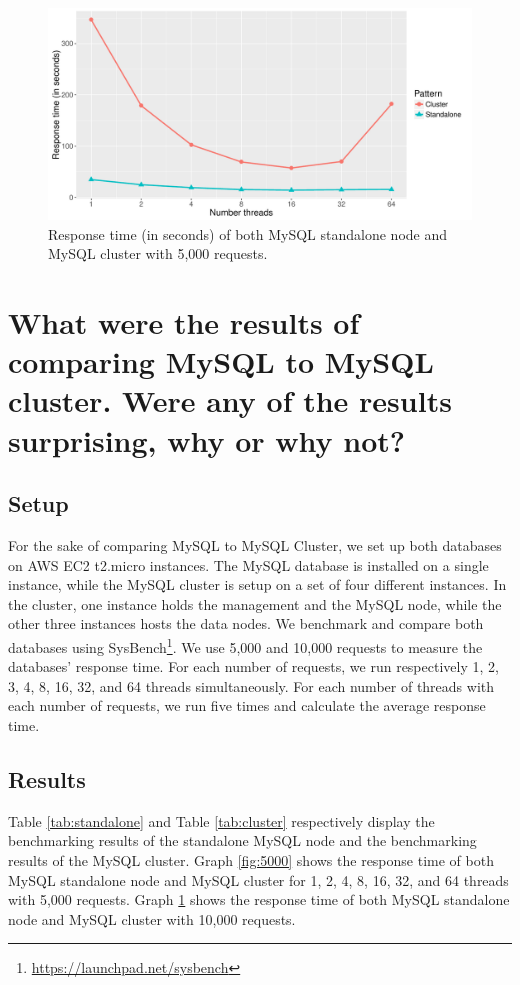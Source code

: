 \documentclass{article}
\begin{document}
  
\begin{figure}[!]
    \centering
        \includegraphics[width = \columnwidth]{images/10000.pdf}
    \caption{Response time (in seconds) of both MySQL standalone node and MySQL cluster with 5,000 requests.}
    \label{fig:10000}
\end{figure}



\section{What were the results of comparing MySQL to MySQL cluster. Were any of the results surprising, why or why not?}\label{Q1}
\subsection{Setup}
For the sake of comparing MySQL to MySQL Cluster, we set up both databases on AWS EC2 t2.micro instances. The MySQL database is installed on a single instance, while the MySQL cluster is setup on a set of four different instances. In the cluster, one instance holds the management and the MySQL node, while the other three instances hosts the data nodes. We benchmark and compare both databases using SysBench\footnote{\url{https://launchpad.net/sysbench}}. We use 5,000 and 10,000 requests to measure the databases' response time. For each number of requests, we run respectively 1, 2, 3, 4, 8, 16, 32, and 64 threads simultaneously. For each number of threads with each number of requests, we run five times and calculate the average response time.


\subsection{Results}
Table \ref{tab:standalone} and Table \ref{tab:cluster} respectively display the benchmarking results of the standalone MySQL node and the benchmarking results of the MySQL cluster. Graph \ref{fig:5000} shows the response time of both MySQL standalone node and MySQL cluster for 1, 2, 4, 8, 16, 32, and 64 threads with 5,000 requests. Graph \ref{fig:10000} shows the response time of both MySQL standalone node and MySQL cluster with 10,000 requests.\\
\end{document}
